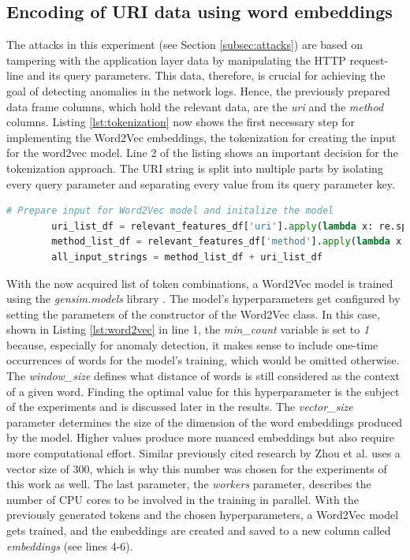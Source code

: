 \subsection{Encoding of URI data using word embeddings}
The attacks in this experiment (see Section \ref{subsec:attacks}) are based on tampering with the application layer data by manipulating the HTTP request-line and its query parameters. This data, therefore, is crucial for achieving the goal of detecting anomalies in the network logs. Hence, the previously prepared data frame columns, which hold the relevant data, are the \emph{uri} and the \emph{method} columns. Listing \ref{lst:tokenization} now shows the first necessary step for implementing the Word2Vec embeddings, the tokenization for creating the input for the word2vec model. Line 2 of the listing shows an important decision for the tokenization approach. The URI string is split into multiple parts by isolating every query parameter and separating every value from its query parameter key. 

\begin{minipage}\linewidth
	\begin{lstlisting}[language={python}, caption={Tokenization of the features for word embeddings}, label={lst:tokenization}] 
        # Prepare input for Word2Vec model and initalize the model
        uri_list_df = relevant_features_df['uri'].apply(lambda x: re.split('[/?&=]', x))
        method_list_df = relevant_features_df['method'].apply(lambda x: [x])
        all_input_strings = method_list_df + uri_list_df
	\end{lstlisting}
\end{minipage}


With the now acquired list of token combinations, a Word2Vec model is trained using the \emph{gensim.models} library \cite{gensim2021}. The model's hyperparameters get configured by setting the parameters of the constructor of the Word2Vec class. In this case, shown in Listing \ref{lst:word2vec} in line 1, the \emph{min\_count} variable is set to \emph{1} because, especially for anomaly detection, it makes sense to include one-time occurrences of words for the model's training, which would be omitted otherwise. The \emph{window\_size} defines what distance of words is still considered as the context of a given word. Finding the optimal value for this hyperparameter is the subject of the experiments and is discussed later in the results. The \emph{vector\_size} parameter determines the size of the dimension of the word embeddings produced by the model. Higher values produce more nuanced embeddings but also require more computational effort. Similar previously cited research by Zhou et al. \cite{zhuo2017network} uses a vector size of 300, which is why this number was chosen for the experiments of this work as well. The last parameter, the \emph{workers} parameter, describes the number of CPU cores to be involved in the training in parallel. With the previously generated tokens and the chosen hyperparameters, a Word2Vec model gets trained, and the embeddings are created and saved to a new column called \emph{embeddings} (see lines 4-6).


